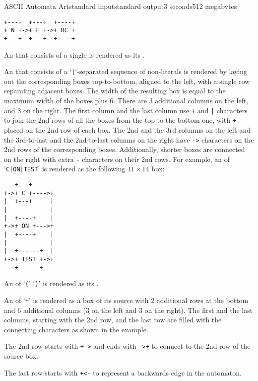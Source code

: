 \begin{problem}{ASCII Automata Art}{standard input}{standard output}{3 seconds}{512 megabytes}
\begin{verbatim}
+---+  +---+  +----+
+ N +->+ E +->+ RC +
+---+  +---+  +----+
\end{verbatim}

An  that consists of a single  is rendered as its .

An  that consists of a `\texttt{|}`-separated sequence of  non-literals is rendered by laying out the corresponding  boxes top-to-bottom, aligned to the left, with a single row separating adjacent  boxes. The width of the resulting box is equal to the maximum width of the  boxes plus 6. There are 3 additional columns on the left, and 3 on the right. The first column and the last column use \texttt{+} and \texttt{|} characters to join the 2nd rows of all the  boxes from the top to the bottom one, with \texttt{+} placed on the 2nd row of each  box. The 2nd and the 3rd columns on the left and the 3rd-to-last and the 2nd-to-last columns on the right have \texttt{->} characters on the 2nd rows of the corresponding  boxes. Additionally, shorter  boxes are connected on the right with extra \texttt{-} characters on their 2nd rows. 
For example, an  of `\texttt{C|ON|TEST}'
is rendered as the following $11 \times 14$ box:

\begin{minipage}{\linewidth}
\begin{verbatim}
   +---+         
+->+ C +---->+
|  +---+     |   
|            |   
|  +----+    |   
+->+ ON +--->+   
|  +----+    |   
|            |   
|  +------+  |   
+->+ TEST +->+   
   +------+      
\end{verbatim}
\end{minipage}

An  of  `\texttt{(}'  `\texttt{)}' is rendered as its .

An  of  `\texttt{+}'  is rendered as a box of its source  with 2 additional rows at the bottom and 6 additional columns (3 on the left and 3 on the right). The first and the last columns, starting with the 2nd row, and the last row are filled with the connecting characters as shown in the example. 

\begin{shortitems}
\item The 2nd row starts with \texttt{+->} and ends with \texttt{->+} to connect to the 2nd row of the source  box. 
\item The last row starts with \texttt{+<-} to represent a backwards edge in the automaton. 
\end{shortitems}


\end{problem}
